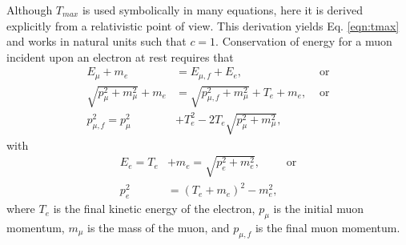Although $T_{max}$ is used symbolically in many equations, here it is derived explicitly from a relativistic point of view. This derivation yields Eq. \eqref{eqn:tmax} and works in natural units such that $c=1$. Conservation of energy for a muon incident upon an electron at rest requires that 
\begin{align}
E_\mu+m_e&=E_{\mu,f}+E_e,&\text{ or} \nonumber\\
\sqrt{p_\mu ^2+m_\mu ^2}+m_e &= \sqrt{p_{\mu,f}^2+m_\mu ^2}+T_e+m_e,&\text{ or} \nonumber \\
p_{\mu,f}^2 =p_\mu^2 &+T_e^2-2T_e\sqrt{p_\mu ^2 + m_\mu^2}, \label{eqn:TMaxEnergy1}
\end{align}
with
\begin{align}
E_e=T_e&+m_e = \sqrt{p_e ^2+m_e^2},\qquad\text{ or} \nonumber\\
p_e ^2&=(T_e+m_e)^2-m_e^2, \label{eqn:TMaxEnergy2}
\end{align}
where $T_e$ is the final kinetic energy of the electron, $p_\mu$ is the initial muon momentum, $m_\mu$ is the mass of the muon, and $p_{\mu,f}$ is the final muon momentum. 


